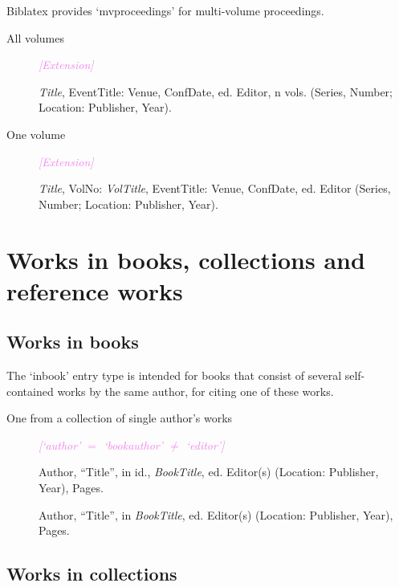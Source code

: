 \documentclass[extrafontsizes,11pt,a4paper,oneside]{memoir}
\newcommand*{\lit}[1]{\textsf{#1}}
\newcommand*{\code}[1]{`\textsf{#1}'}
\newcommand*{\aside}[1]{\textcolor{violet}{\emph{[#1]}}}
\begin{document}
    Biblatex provides \code{mvproceedings} for multi-volume proceedings.
    
    \begin{description}
        \item[All volumes] \aside{Extension}\par
        \emph{Title}, EventTitle: Venue, ConfDate, \lit{ed.} Editor, n \lit{vols.} (Series, Number; Location: Publisher, Year).
        \\
        
        \item[One volume] \aside{Extension}\par
        \emph{Title}, VolNo: \emph{VolTitle}, EventTitle: Venue, ConfDate, \lit{ed.} Editor (Series, Number; Location: Publisher, Year).
        \\
        
    \end{description}
    
    \section{Works in books, collections and reference works}\label{sec:inx}
    
    \subsection{Works in books}
    
    The \code{inbook} entry type is intended for books that consist of several self-contained works by the same author, for citing one of these works. 
    
    \begin{description}
        \item[One from a collection of single author's works] \aside{\code{author} $=$ \code{bookauthor} $\neq$ \code{editor}}
        \par Author, \enquote{Title}, \lit{in id.}, \emph{BookTitle}, \lit{ed.} Editor(s) (Location: Publisher, Year), Pages.
        \\
        \par Author, \enquote{Title}, \lit{in} \emph{BookTitle}, \lit{ed.} Editor(s) (Location: Publisher, Year), Pages.
    \end{description}
    
    \subsection{Works in collections}
    
\end{document}
